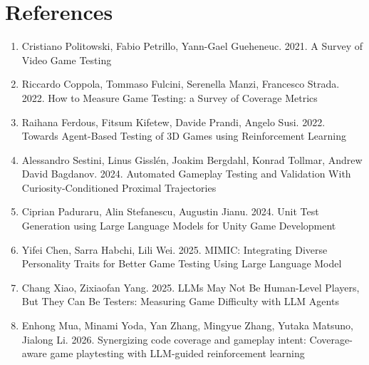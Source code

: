 \documentclass[12pt]{article}
\begin{document}
\section*{References}

\begin{enumerate}
\renewcommand{\labelenumi}{[\arabic{enumi}]}
\item\label{ref-1} Cristiano Politowski, Fabio Petrillo, Yann-Gael Gueheneuc. 2021. A Survey of Video Game Testing
\item\label{ref-2} Riccardo Coppola, Tommaso Fulcini, Serenella Manzi, Francesco Strada. 2022. How to Measure Game Testing: a Survey of Coverage Metrics
\item\label{ref-3} Raihana Ferdous, Fitsum Kifetew, Davide Prandi, Angelo Susi. 2022. Towards Agent-Based Testing of 3D Games using Reinforcement Learning
\item\label{ref-4} Alessandro Sestini, Linus Gisslén, Joakim Bergdahl, Konrad Tollmar, Andrew David Bagdanov. 2024. Automated Gameplay Testing and Validation With Curiosity-Conditioned Proximal Trajectories
\item\label{ref-5} Ciprian Paduraru, Alin Stefanescu, Augustin Jianu. 2024. Unit Test Generation using Large Language Models for Unity Game Development
\item\label{ref-6} Yifei Chen, Sarra Habchi, Lili Wei. 2025. MIMIC: Integrating Diverse Personality Traits for Better Game Testing Using Large Language Model
\item\label{ref-7} Chang Xiao, Zixiaofan Yang. 2025. LLMs May Not Be Human-Level Players, But They Can Be Testers: Measuring Game Difficulty with LLM Agents
\item\label{ref-8} Enhong Mua, Minami Yoda, Yan Zhang, Mingyue Zhang, Yutaka Matsuno, Jialong Li. 2026. Synergizing code coverage and gameplay intent: Coverage-aware game playtesting with LLM-guided reinforcement learning
\end{enumerate}
\end{document}

